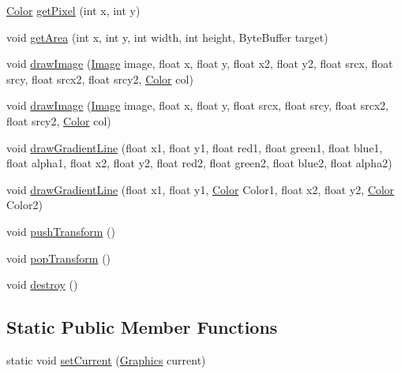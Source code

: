 \begin{DoxyCompactItemize}
\mbox{\hyperlink{classorg_1_1newdawn_1_1slick_1_1_color}{Color}} \mbox{\hyperlink{classorg_1_1newdawn_1_1slick_1_1_graphics_ad338ae801f15815df18bd3ac38bf6b19}{get\+Pixel}} (int x, int y)
\item 
void \mbox{\hyperlink{classorg_1_1newdawn_1_1slick_1_1_graphics_a6806d7350fea925c4b2282fd319f732f}{get\+Area}} (int x, int y, int width, int height, Byte\+Buffer target)
\item 
void \mbox{\hyperlink{classorg_1_1newdawn_1_1slick_1_1_graphics_ad6fb42b1baaf5b01a16a29b1a9827c43}{draw\+Image}} (\mbox{\hyperlink{classorg_1_1newdawn_1_1slick_1_1_image}{Image}} image, float x, float y, float x2, float y2, float srcx, float srcy, float srcx2, float srcy2, \mbox{\hyperlink{classorg_1_1newdawn_1_1slick_1_1_color}{Color}} col)
\item 
void \mbox{\hyperlink{classorg_1_1newdawn_1_1slick_1_1_graphics_a2c233df85a05a57a34775de4357f9875}{draw\+Image}} (\mbox{\hyperlink{classorg_1_1newdawn_1_1slick_1_1_image}{Image}} image, float x, float y, float srcx, float srcy, float srcx2, float srcy2, \mbox{\hyperlink{classorg_1_1newdawn_1_1slick_1_1_color}{Color}} col)
\item 
void \mbox{\hyperlink{classorg_1_1newdawn_1_1slick_1_1_graphics_a3cc658e8299c032f39a2f8378e214f98}{draw\+Gradient\+Line}} (float x1, float y1, float red1, float green1, float blue1, float alpha1, float x2, float y2, float red2, float green2, float blue2, float alpha2)
\item 
void \mbox{\hyperlink{classorg_1_1newdawn_1_1slick_1_1_graphics_ab06cdb2dda1ce8b284e0f68a1604968e}{draw\+Gradient\+Line}} (float x1, float y1, \mbox{\hyperlink{classorg_1_1newdawn_1_1slick_1_1_color}{Color}} Color1, float x2, float y2, \mbox{\hyperlink{classorg_1_1newdawn_1_1slick_1_1_color}{Color}} Color2)
\item 
void \mbox{\hyperlink{classorg_1_1newdawn_1_1slick_1_1_graphics_aabec073ba0ee1e86cccddc175f2ebbb5}{push\+Transform}} ()
\item 
void \mbox{\hyperlink{classorg_1_1newdawn_1_1slick_1_1_graphics_a12d08ed83f89d831b864b10ea5769bbb}{pop\+Transform}} ()
\item 
void \mbox{\hyperlink{classorg_1_1newdawn_1_1slick_1_1_graphics_a44477025ba5a47f93552fa1f5cd15480}{destroy}} ()
\end{DoxyCompactItemize}
\subsection*{Static Public Member Functions}
\begin{DoxyCompactItemize}
\item 
static void \mbox{\hyperlink{classorg_1_1newdawn_1_1slick_1_1_graphics_ae48fbeb2d9125d9de9ec19c8d71c5df5}{set\+Current}} (\mbox{\hyperlink{classorg_1_1newdawn_1_1slick_1_1_graphics}{Graphics}} current)
\end{DoxyCompactItemize}
